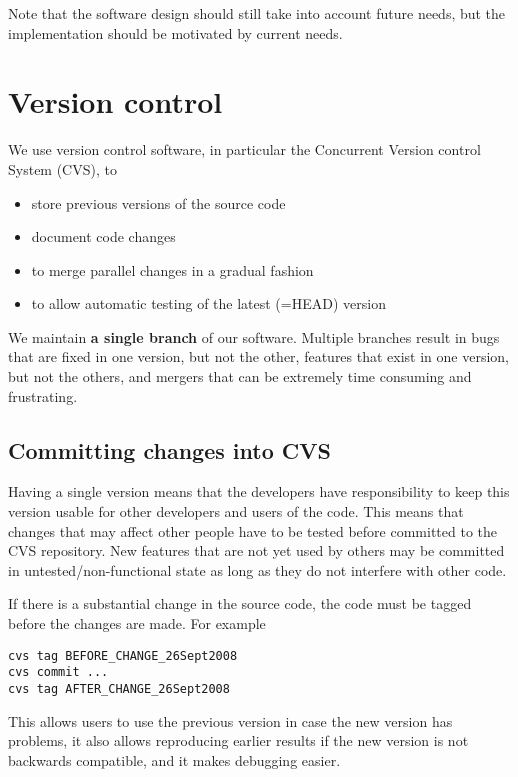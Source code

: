 \documentclass{article}
\begin{document}
Note that the software design should still take into account future needs,
but the implementation should be motivated by current needs.

\section{Version control}

We use version control software, in particular the 
Concurrent Version control System (CVS), to 
\begin{itemize}
\item store previous versions of the source code
\item document code changes
\item to merge parallel changes in a gradual fashion
\item to allow automatic testing of the latest (=HEAD) version
\end{itemize}
We maintain {\bf a single branch} of our software. 
Multiple branches result in bugs that are fixed in one version, but not the 
other, features that exist in one version, but not the others, and mergers
that can be extremely time consuming and frustrating.

\subsection{Committing changes into CVS}

Having a single version means that the developers have responsibility to 
keep this version usable for other developers and users of the code. This
means that changes that may affect other people have to be tested before
committed to the CVS repository. New features that are not yet used by others
may be committed in untested/non-functional state as long as they do not 
interfere with other code.

If there is a substantial change in the source code, the code must be 
tagged before the changes are made. For example
\begin{verbatim}
cvs tag BEFORE_CHANGE_26Sept2008
cvs commit ...
cvs tag AFTER_CHANGE_26Sept2008
\end{verbatim}
This allows users to use the previous version in case the new version has
problems, it also allows reproducing earlier results if the new version is
not backwards compatible, and it makes debugging easier.
\end{document}
